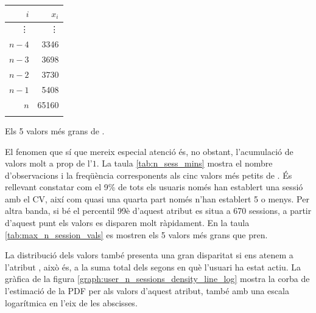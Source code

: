 \documentclass[
	a4paper,
	twoside,
	justified
]{tufte-book}
\begin{document}
\begin{margintable}
	\begin{center}
	\begin{tabular}{rr}
	\toprule
 	$i$ & $x_i$ \\
	\midrule
	\vdots & \vdots \\
	$n-4$ & 3346 \\
	$n-3$ & 3698 \\
	$n-2$ & 3730 \\
	$n-1$ & 5408 \\
	$n$   & 65160 \\ 
	\bottomrule \\
	\end{tabular}
	\end{center}
	\caption{
		\label{tab:max_n_session_vals}
		Els 5 valors més grans de .  
	}
	\end{margintable} 

El fenomen que sí que mereix especial atenció és, no obstant, l'acumulació de valors molt a prop de l'$1$. La taula \ref{tab:n_sess_mins} mostra el nombre d'observacions i la freqüència corresponents als cinc valors més petits de . És rellevant constatar com el 9\% de tots els usuaris només han establert una sessió amb el CV, així com quasi una quarta part només n'han establert 5 o menys. Per altra banda, si bé el percentil 99è d'aquest atribut es situa a 670 sessions, a partir d'aquest punt els valors es disparen molt ràpidament. En la taula \ref{tab:max_n_session_vals} es mostren els 5 valors més grans que pren.

La distribució dels valors també presenta una gran disparitat si ens atenem a l'atribut , això és, a la suma total dels segons en què l'usuari ha estat actiu. La gràfica de la figura \ref{graph:user_n_sessions_density_line_log} mostra la corba de l'estimació de la PDF per als valors d'aquest atribut, també amb una escala logarítmica en l'eix de les abscisses.    
\end{document}
